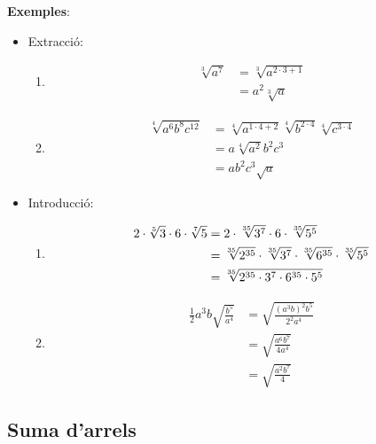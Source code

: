 \textbf{Exemples}:

\begin{itemize}
\item Extracció:

\begin{enumerate}
\item 
\begin{align*}
\sqrt[3]{a^{7}} &=\sqrt[3]{a^{2\cdot 3+1}} \\
&=a^{2}\sqrt[3]{a}
\end{align*}

\item 
\begin{align*}
\sqrt[4]{a^{6}b^{8}c^{12}} &=\sqrt[4]{a^{1\cdot 4+2}}\sqrt[4]{b^{2\cdot 4}}%
\sqrt[4]{c^{3\cdot 4}} \\
&=a\sqrt[4]{a^{2}}b^{2}c^{3} \\
&=ab^{2}c^{3}\sqrt{a}
\end{align*}
\end{enumerate}

\item Introducció:

\begin{enumerate}
\item 
\begin{align*}
2\cdot \sqrt[5]{3}\cdot 6\cdot \sqrt[7]{5} &=2\cdot \sqrt[35]{3^{7}}\cdot
6\cdot \sqrt[35]{5^{5}} \\
&=\sqrt[35]{2^{35}}\cdot \sqrt[35]{3^{7}}\cdot \sqrt[35]{6^{35}}\cdot \sqrt[%
35]{5^{5}} \\
&=\sqrt[35]{2^{35}\cdot 3^{7}\cdot 6^{35}\cdot 5^{5}}
\end{align*}

\item 
\begin{align*}
\frac{1}{2}a^{3}b\sqrt{\frac{b^{5}}{a^{4}}} &=\sqrt{\frac{\left(
a^{3}b\right) ^{2}b^{5}}{2^{2}a^{4}}} \\
&=\sqrt{\frac{a^{6}b^{7}}{4a^{4}}} \\
&=\sqrt{\frac{a^{2}b^{7}}{4}}
\end{align*}
\end{enumerate}
\end{itemize}

\subsection{Suma d’arrels}

